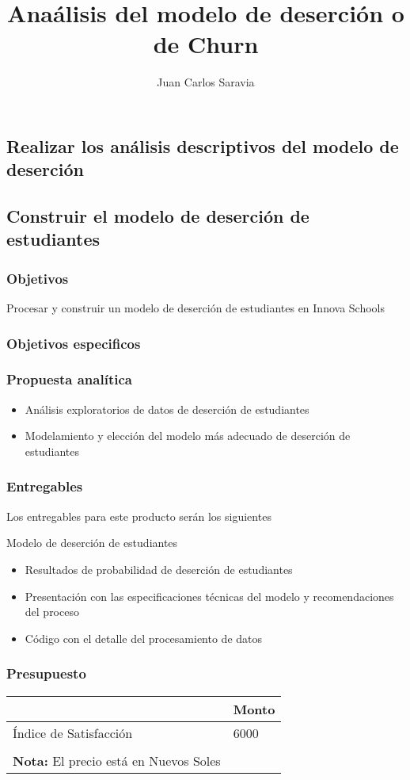 \documentclass{beamer}
\title{Anaálisis del modelo de deserción o de Churn}
\author{Juan Carlos Saravia}
\date{}
\begin{document}
\begin{frame}
\titlepage
\end{frame}


\subsection{Realizar los análisis descriptivos del modelo de deserción}
\subsection{Construir el modelo de deserción de estudiantes}


\begin{frame}
\frametitle{Objetivos}
Procesar y construir un modelo de deserción de estudiantes en Innova Schools
\end{frame}



\begin{frame}
\frametitle{Objetivos especificos}
\tableofcontents
\end{frame}

\begin{frame}
\frametitle{Propuesta analítica}

\begin{itemize}
\item Análisis exploratorios de datos de deserción de estudiantes
\item Modelamiento y elección del modelo más adecuado de deserción de estudiantes
\end{itemize}	

\end{frame}

\begin{frame}
\frametitle{Entregables}

Los entregables para este producto serán los siguientes 

\begin{block}{Modelo de deserción de estudiantes}
\begin{itemize}
\item Resultados de probabilidad de deserción de estudiantes
\item Presentación con las especificaciones técnicas del modelo y recomendaciones del proceso
\item Código con el detalle del procesamiento de datos
\end{itemize}
\end{block}
\end{frame}

\begin{frame}
\frametitle{Presupuesto}
\begin{table}[ht]
\begin{tabular}{ll}
\hline
                       & Monto \\ \hline
Índice de Satisfacción & 6000  \\ \hline 
\\

\textbf{Nota:} El precio está en \alert{Nuevos Soles}
\end{tabular}
\end{table}





\end{frame}
\end{document}
